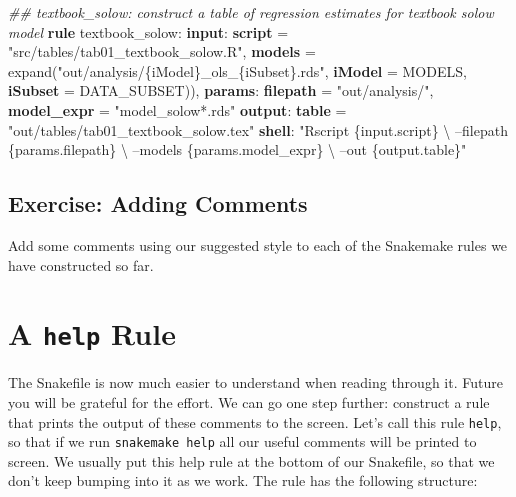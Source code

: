 \documentclass[]{book}
\newenvironment{Shaded}{\begin{snugshade}}{\end{snugshade}}
\newcommand{\KeywordTok}[1]{\textcolor[rgb]{0.13,0.29,0.53}{\textbf{{#1}}}}
\newcommand{\StringTok}[1]{\textcolor[rgb]{0.31,0.60,0.02}{{#1}}}
\newcommand{\CommentTok}[1]{\textcolor[rgb]{0.56,0.35,0.01}{\textit{{#1}}}}
\newcommand{\NormalTok}[1]{{#1}}
\theoremstyle{definition}
\theoremstyle{definition}
\theoremstyle{definition}
\theoremstyle{remark}
\begin{document}
\begin{Shaded}
\begin{Highlighting}[]
\CommentTok{## textbook_solow: construct a table of regression estimates for textbook solow model}
\KeywordTok{rule} \NormalTok{textbook_solow:}
    \KeywordTok{input}\NormalTok{:}
        \KeywordTok{script} \NormalTok{= }\StringTok{"src/tables/tab01_textbook_solow.R"}\NormalTok{,}
        \KeywordTok{models} \NormalTok{= expand(}\StringTok{"out/analysis/\{iModel\}_ols_\{iSubset\}.rds"}\NormalTok{,}
                            \KeywordTok{iModel} \NormalTok{= MODELS,}
                            \KeywordTok{iSubset} \NormalTok{= DATA_SUBSET)),}
    \KeywordTok{params}\NormalTok{:}
        \KeywordTok{filepath}   \NormalTok{= }\StringTok{"out/analysis/"}\NormalTok{,}
        \KeywordTok{model_expr} \NormalTok{= }\StringTok{"model_solow*.rds"}
    \KeywordTok{output}\NormalTok{:}
        \KeywordTok{table} \NormalTok{= }\StringTok{"out/tables/tab01_textbook_solow.tex"}
    \KeywordTok{shell}\NormalTok{:}
        \StringTok{"Rscript \{input.script\} \textbackslash{}}
\StringTok{            --filepath \{params.filepath\} \textbackslash{}}
\StringTok{            --models \{params.model_expr\} \textbackslash{}}
\StringTok{            --out \{output.table\}"}
\end{Highlighting}
\end{Shaded}

\subsection*{Exercise: Adding Comments}\label{exercise-adding-comments}

Add some comments using our suggested style to each of the Snakemake
rules we have constructed so far.

\section{\texorpdfstring{A \texttt{help}
Rule}{A help Rule}}\label{a-help-rule}

The Snakefile is now much easier to understand when reading through it.
Future you will be grateful for the effort. We can go one step further:
construct a rule that prints the output of these comments to the screen.
Let's call this rule \texttt{help}, so that if we run
\texttt{snakemake\ help} all our useful comments will be printed to
screen. We usually put this help rule at the bottom of our Snakefile, so
that we don't keep bumping into it as we work. The rule has the
following structure:
\end{document}
